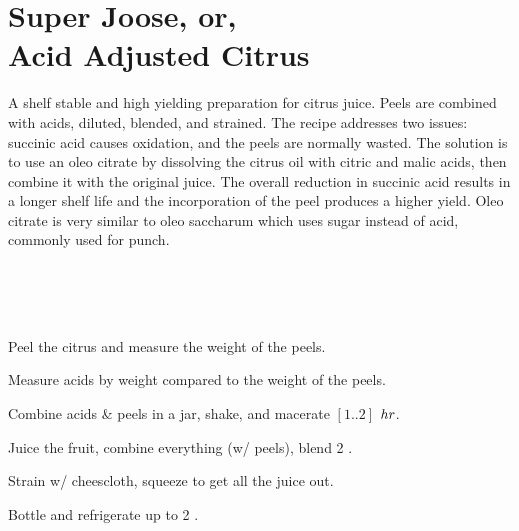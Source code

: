 \section[Super Joose]{
    Super Joose, or,\\Acid Adjusted Citrus
}

\begin{recipestats}[
        servings=$\approx 12$ \fluidounce,
        preptime=30 \minute,
        inactivetime=2 \hour,
        original=\citeauthor{superJuiceKos}\cite{superJuiceKos},
    ]
\end{recipestats}

\begin{recipeabstract}
    A shelf stable and high yielding preparation for citrus juice.
    Peels are combined with acids, diluted, blended, and strained.
    The recipe addresses two issues: succinic acid causes oxidation, and the peels
    are normally wasted.
    The solution is to use an oleo citrate by dissolving the citrus oil with citric
    and malic acids, then combine it with the original juice.
    The overall reduction in succinic acid results in a longer shelf life and the
    incorporation of the peel produces a higher yield.
    Oleo citrate is very similar to oleo saccharum which uses sugar instead of acid,
    commonly used for punch\cite{oleoSaccharum}.
\end{recipeabstract}

\begin{ingredientcolumns}[1]
    \begin{ingredientblock}
        \\
        \\
        \\
    \end{ingredientblock}
\end{ingredientcolumns}

\begin{preparation}
\item Peel the citrus and measure the weight of the peels.
\item Measure acids by weight compared to the weight of the peels.
\item Combine acids \& peels in a jar, shake, and macerate $[1..2]$ $\hour$.
\item Juice the fruit, combine everything (w/ peels), blend 2 \minute.
\item Strain w/ cheescloth, squeeze to get all the juice out.
\item Bottle and refrigerate up to 2 \week.
\end{preparation}

